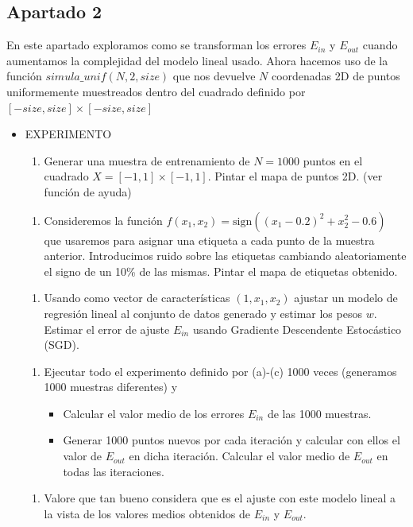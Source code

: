 \documentclass[11pt,a4paper]{article}
\newcommand{\sign}{\text{sign}}
\begin{document}
\subsection*{Apartado 2}
\noindent En este apartado exploramos como se transforman los errores $E_{in}$ y $E_{out}$ cuando aumentamos la complejidad
del modelo lineal usado. Ahora hacemos uso de la función $simula\_unif (N, 2, size)$ que nos devuelve $N$ coordenadas 2D de
puntos uniformemente muestreados dentro del cuadrado definido por $[-size, size] \times [-size, size]$

\begin{itemize}
	\item EXPERIMENTO
	\begin{enumerate}[label=\alph*)]
		\item Generar una muestra de entrenamiento de $N = 1000$ puntos en el cuadrado $X = [-1, 1] \times [-1, 1]$.
		Pintar el mapa de puntos 2D. (ver función de ayuda)
	\end{enumerate}
	
	\begin{enumerate}[resume, label=\alph*)]
		\item Consideremos la función $f(x_1, x_2) = \sign((x_1 - 0.2)^2 + x_2^2 - 0.6)$ que usaremos para asignar una
		etiqueta a cada punto de la muestra anterior. Introducimos ruido sobre las etiquetas cambiando aleatoriamente
		el signo de un 10\% de las mismas. Pintar el mapa de etiquetas obtenido.
	\end{enumerate}
	
	\begin{enumerate}[resume, label=\alph*)]
		\item Usando como vector de características $(1, x_1, x_2)$ ajustar un modelo de regresión lineal al conjunto de
		datos generado y estimar los pesos $w$. Estimar el error de ajuste $E_{in}$ usando Gradiente Descendente Estocástico
		(SGD).
	\end{enumerate}
	
	\begin{enumerate}[resume, label=\alph*)]
		\item Ejecutar todo el experimento definido por (a)-(c) 1000 veces (generamos 1000 muestras diferentes) y
		\begin{itemize}
			\item Calcular el valor medio de los errores $E_{in}$ de las 1000 muestras.
			\item Generar 1000 puntos nuevos por cada iteración y calcular con ellos el valor de $E_{out}$ en dicha iteración.
			Calcular el valor medio de $E_{out}$ en todas las iteraciones.
		\end{itemize}
	\end{enumerate}
	
	\begin{enumerate}[resume, label=\alph*)]
		\item Valore que tan bueno considera que es el ajuste con este modelo lineal a la vista de los valores medios
		obtenidos de $E_{in}$ y $E_{out}$.
	\end{enumerate}
\end{itemize}
\end{document}
